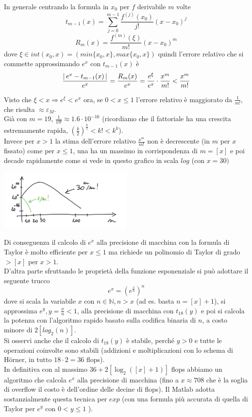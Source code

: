 \documentclass[12pt]{article}
\DeclarePairedDelimiter{\abs}{\lvert}{\rvert}
\begin{document}
\bigskip
In generale centrando la formula in $x_0$ per $f$ derivabile $m$ volte
\[t_{m-1}\left(x\right)=\sum_{j=0}^{m-1}\frac{f^{\left( j\right)}\left(x_0\right)}{j!}\left(x-x_0\right)^j\]
\[R_m\left(x\right)=\frac{f^{\left(m\right)}\left(\xi\right)}{m!}\left(x-x_0\right)^m\]
dove $\xi\in int(x_0,x)=(min\{x_0,x\},max\{x_0,x\})$ quindi l'errore relativo che si commette approssimando $e^x$ con $t_{m-1}(x)$ è
\[\frac{\abs{\,e^x-t_{m-1}(x)\,}}{e^x}=\frac{R_m(x)}{e^x}=\frac{e^\xi}{e^x}\cdot\frac{x^m}{m!}
<\frac{x^m}{m!}\]

Visto che $\xi<x \Rightarrow e^\xi < e^x$ ora, se $0<x\le1$ l'errore relativo è maggiorato da $\frac{1}{m!}$, che risulta $\approx \varepsilon_M$.\\
Già con $m=19$, $\frac{1}{19!}\approx 1.6\cdot10^{-16}$ (ricordiamo che il fattoriale ha una crescita estremamente rapida, $\left(\frac{k}{2}\right)^{\frac{k}{2}}<k!<k^k$).\\
Invece per $x>1$ la stima dell'errore relativo $\frac{x^m}{m!}$ non è decrescente (in $m$ per $x$ fissato) come per $x \le 1$, una ha un massimo in corrispondenza di $m =[x]$ e poi decade rapidamente come si vede in questo grafico in scala $log$ (con $x=30)$
\begin{center}
    \includegraphics[width=0.5\textwidth]{grafo1.png}
\end{center}
Di conseguenza il calcolo di $e^x$ alla precisione di macchina con la formula di Taylor è molto efficiente per $x \le 1$ ma richiede un polinomio di Taylor di grado $> [x]$ per $x>1$. \\
D'altra parte sfruttando le proprietà della funzione esponenziale si può adottare il seguente trucco
\[e^x = (e^{\frac{x}{n}})^n\]
dove si scala la variabile $x$ con $n \in \mathbb{N} , n > x$ (ad es. basta $n = [x]+1$), si approssima $e^y, y = \frac{x}{n}<1$, alla precisione di macchina con $t_{18}(y)$ e poi si calcola la potenza con l'algoritmo rapido basato sulla codifica binaria di $n$, a costo minore di $2[log_2(n)]$.\\
Si osservi anche che il calcolo di $t_{18} (y)$ è stabile, perché $y>0$ e tutte le operazioni coinvolte sono stabili (addizioni e moltiplicazioni con lo schema di Hörner, in tutto $18\cdot 2=36$ flops). \\
In definitiva con al massimo $36+2[ \log_2([x]+1)]$ flops abbiamo un algoritmo che calcola $e^x$ alla precisione di macchina (fino a $x \approx 708$ che è la soglia di overflow il costo è dell'ordine delle decine di flops).
Il Matlab adotta sostanzialmente questa tecnica per $exp$ (con una formula più accurata di quella di Taylor per $e^y$ con $0<y\le 1$ ).
\end{document}
